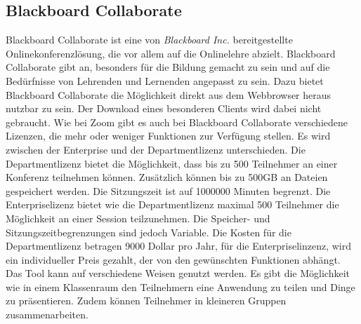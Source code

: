 \subsection{Blackboard Collaborate}
Blackboard Collaborate ist eine von \textit{Blackboard Inc.} bereitgestellte Onlinekonferenzlösung, die vor allem auf die Onlinelehre abzielt.
\autocite[Vgl.][]{M_Blackboard.o.J.}
Blackboard Collaborate gibt an, besonders für die Bildung gemacht zu sein und auf die Bedürfnisse von Lehrenden und Lernenden angepasst zu sein.
Dazu bietet Blackboard Collaborate die Möglichkeit direkt aus dem Webbrowser heraus nutzbar zu sein.
Der Download eines besonderen Clients wird dabei nicht gebraucht.
Wie bei Zoom gibt es auch bei Blackboard Collaborate verschiedene Lizenzen, die mehr oder weniger Funktionen zur Verfügung stellen.
Es wird zwischen der Enterprise und der Departmentlizenz unterschieden.
Die Departmentlizenz bietet die Möglichkeit, dass bis zu 500 Teilnehmer an einer Konferenz teilnehmen können.
Zusätzlich können bis zu 500GB an Dateien gespeichert werden. Die Sitzungszeit ist auf 1000000 Minuten begrenzt.
Die Enterpriselizenz bietet wie die Departmentlizenz maximal 500 Teilnehmer die Möglichkeit an einer Session teilzunehmen.
Die Speicher- und Sitzungszeitbegrenzungen sind jedoch Variable.
Die Kosten für die Departmentlizenz betragen 9000 Dollar pro Jahr, für die Enterpriselinzenz, wird ein individueller Preis gezahlt, der von den gewünschten Funktionen abhängt.
\autocite[Vgl.][]{M_Blackboard.o.J.}
\\
Das Tool kann auf verschiedene Weisen genutzt werden.
Es gibt die Möglichkeit wie in einem Klassenraum den Teilnehmern eine Anwendung zu teilen und Dinge zu präsentieren.
Zudem können Teilnehmer in kleineren Gruppen zusammenarbeiten.
\autocite[Vgl.][]{M_Blackboard.o.J.}
\\

